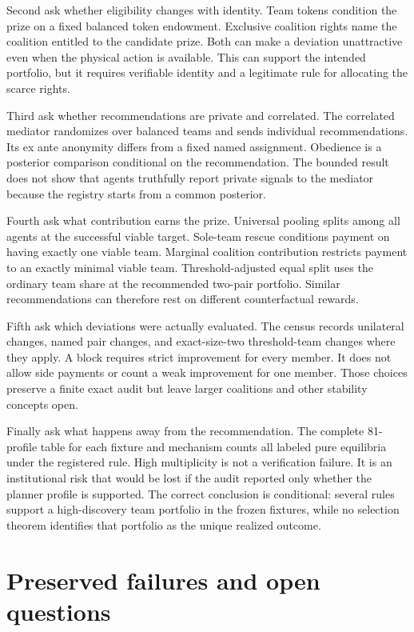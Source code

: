 \documentclass[11pt]{article}
\begin{document}
Second ask whether eligibility changes with identity. Team tokens condition
the prize on a fixed balanced token endowment. Exclusive coalition rights name
the coalition entitled to the candidate prize. Both can make a deviation
unattractive even when the physical action is available. This can support the
intended portfolio, but it requires verifiable identity and a legitimate rule
for allocating the scarce rights.

Third ask whether recommendations are private and correlated. The correlated
mediator randomizes over balanced teams and sends individual recommendations.
Its ex ante anonymity differs from a fixed named assignment. Obedience is a
posterior comparison conditional on the recommendation. The bounded result does
not show that agents truthfully report private signals to the mediator because
the registry starts from a common posterior.

Fourth ask what contribution earns the prize. Universal pooling splits among
all agents at the successful viable target. Sole-team rescue conditions payment
on having exactly one viable team. Marginal coalition contribution restricts
payment to an exactly minimal viable team. Threshold-adjusted equal split uses
the ordinary team share at the recommended two-pair portfolio. Similar
recommendations can therefore rest on different counterfactual rewards.

Fifth ask which deviations were actually evaluated. The census records
unilateral changes, named pair changes, and exact-size-two threshold-team
changes where they apply. A block requires strict improvement for every member.
It does not allow side payments or count a weak improvement for one member.
Those choices preserve a finite exact audit but leave larger coalitions and
other stability concepts open.

Finally ask what happens away from the recommendation. The complete 81-profile
table for each fixture and mechanism counts all labeled pure equilibria under
the registered rule. High multiplicity is not a verification failure. It is an
institutional risk that would be lost if the audit reported only whether the
planner profile is supported. The correct conclusion is conditional: several
rules support a high-discovery team portfolio in the frozen fixtures, while no
selection theorem identifies that portfolio as the unique realized outcome.

\section{Preserved failures and open questions}
\end{document}
